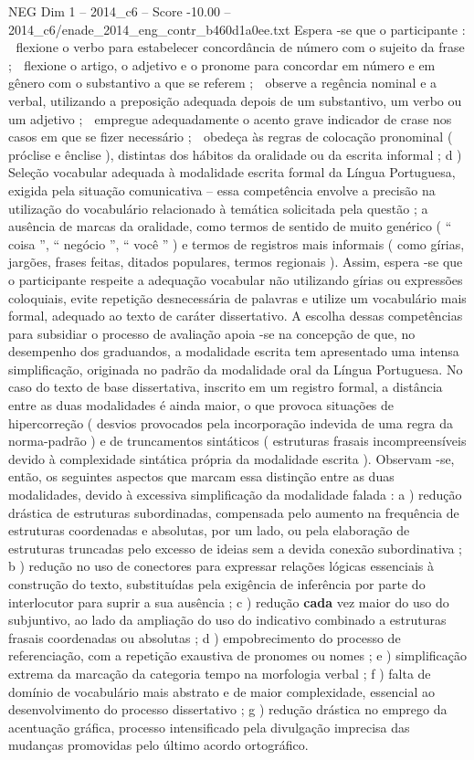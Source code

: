 \begin{textsample}{NEG Dim 1 – 2014\_c6 – Score -10.00 – 2014\_c6/enade\_2014\_eng\_contr\_b460d1a0ee.txt}
Espera -se que o participante :  flexione o verbo para estabelecer concordância de número com o sujeito da frase ;  flexione o artigo, o adjetivo e o pronome para concordar em número e em gênero com o substantivo a que se referem ;  observe a regência nominal e a verbal, utilizando a preposição adequada depois de um substantivo, um verbo ou um adjetivo ;  empregue adequadamente o acento grave indicador de crase nos casos em que se fizer necessário ;  obedeça às regras de colocação pronominal ( próclise e ênclise ), distintas dos hábitos da oralidade ou da escrita informal ; d ) Seleção vocabular adequada à modalidade escrita formal da Língua Portuguesa, exigida pela situação comunicativa – essa competência envolve a precisão na utilização do vocabulário relacionado à temática solicitada pela questão ; a ausência de marcas da oralidade, como termos de sentido de muito genérico ( “ coisa ”, “ negócio ”, “ você ” ) e termos de registros mais informais ( como gírias, jargões, frases feitas, ditados populares, termos regionais ).
Assim, espera -se que o participante respeite a adequação vocabular não utilizando gírias ou expressões coloquiais, evite repetição desnecessária de palavras e utilize um vocabulário mais formal, adequado ao texto de caráter dissertativo.
A escolha dessas competências para subsidiar o processo de avaliação apoia -se na concepção de que, no desempenho dos graduandos, a modalidade escrita tem apresentado uma intensa simplificação, originada no padrão da modalidade oral da Língua Portuguesa.
No caso do texto de base dissertativa, inscrito em um registro formal, a distância entre as duas modalidades é ainda maior, o que provoca situações de hipercorreção ( desvios provocados pela incorporação indevida de uma regra da norma-padrão ) e de truncamentos sintáticos ( estruturas frasais incompreensíveis devido à complexidade sintática própria da modalidade escrita ).
Observam -se, então, os seguintes aspectos que marcam essa distinção entre as duas modalidades, devido à excessiva simplificação da modalidade falada : a ) redução drástica de estruturas subordinadas, compensada pelo aumento na frequência de estruturas coordenadas e absolutas, por um lado, ou pela elaboração de estruturas truncadas pelo excesso de ideias sem a devida conexão subordinativa ; b ) redução no uso de conectores para expressar relações lógicas essenciais à construção do texto, substituídas pela exigência de inferência por parte do interlocutor para suprir a sua ausência ; c ) redução \textbf{cada} vez maior do uso do subjuntivo, ao lado da ampliação do uso do indicativo combinado a estruturas frasais coordenadas ou absolutas ; d ) empobrecimento do processo de referenciação, com a repetição exaustiva de pronomes ou nomes ; e ) simplificação extrema da marcação da categoria tempo na morfologia verbal ; f ) falta de domínio de vocabulário mais abstrato e de maior complexidade, essencial ao desenvolvimento do processo dissertativo ; g ) redução drástica no emprego da acentuação gráfica, processo intensificado pela divulgação imprecisa das mudanças promovidas pelo último acordo ortográfico.

\end{textsample}
